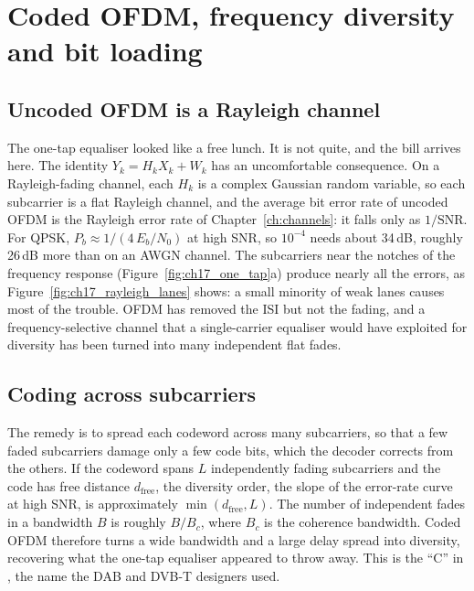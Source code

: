 
\section{Coded OFDM, frequency diversity and bit loading}
\label{sec:ch17:coded}

\subsection{Uncoded OFDM is a Rayleigh channel}

The one-tap equaliser looked like a free lunch. It is not quite, and the bill arrives here. The
identity $Y_k=H_kX_k+W_k$ has an uncomfortable consequence. On a Rayleigh-fading channel, each $H_k$ is a
complex Gaussian random variable, so each subcarrier is a flat Rayleigh channel, and the average bit error
rate of uncoded OFDM is the Rayleigh error rate of Chapter~\ref{ch:channels}: it falls only as $1/\text{SNR}$.
For QPSK, $P_b\approx1/(4\,E_b/N_0)$ at high SNR, so $10^{-4}$ needs about 34\,dB, roughly 26\,dB more than on an
AWGN channel. The subcarriers near the notches of the frequency response
(Figure~\ref{fig:ch17_one_tap}a) produce nearly all the errors, as Figure~\ref{fig:ch17_rayleigh_lanes}
shows: a small minority of weak lanes causes most of the trouble. OFDM has removed the ISI but not the
fading, and a frequency-selective channel that a single-carrier equaliser would have exploited for diversity
has been turned into many independent flat fades.

\subsection{Coding across subcarriers}

The remedy is to spread each codeword across many subcarriers, so that a few faded subcarriers damage
only a few code bits, which the decoder corrects from the others. If the codeword spans $L$ independently
fading subcarriers and the code has free distance $d_{\text{free}}$, the diversity order, the slope of the
error-rate curve at high SNR, is approximately $\min(d_{\text{free}},L)$. The number of independent fades in
a bandwidth $B$ is roughly $B/B_c$, where $B_c$ is the coherence bandwidth. Coded OFDM therefore turns a wide
bandwidth and a large delay spread into diversity, recovering what the one-tap equaliser appeared to
throw away. This is the ``C'' in , the name the DAB and DVB-T designers used.

